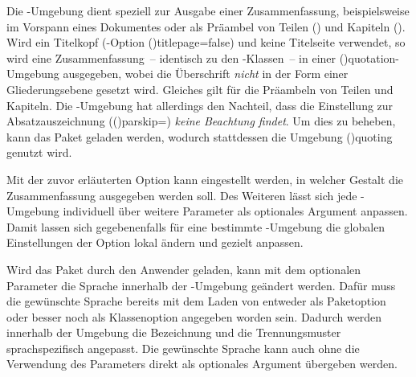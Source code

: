 \begin{DeclareEntity*}{}
\begin{DeclareEntity*}{}
\begin{DeclareEntity*}{}
\begin{Declaration}
\begin{Declaration}
\begin{Declaration}
\begin{Declaration}
\begin{Declaration}
\begin{Declaration}
\begin{Declaration}
Die -Umgebung dient speziell zur Ausgabe einer 
Zusammenfassung, beispielsweise im Vorspann eines Dokumentes oder als Präambel 
von Teilen () und Kapiteln ().
Wird ein Titelkopf 
(\KOMAScript-Option \Option(){titlepage=false})
und keine Titelseite verwendet, so wird eine Zusammenfassung~-- identisch zu den 
\KOMAScript-Klassen~-- in einer 
\Environment(){quotation}-Umgebung 
ausgegeben, wobei die Überschrift \emph{nicht} in der Form einer Gliederungsebene 
gesetzt wird. Gleiches gilt für die Präambeln von Teilen und Kapiteln. Die 
-Umgebung
hat allerdings den Nachteil, dass die Einstellung zur Absatzauszeichnung 
(\Option(){parskip=\PMisc}) \emph{keine Beachtung findet}. 
Um dies zu beheben, kann das Paket  geladen werden, wodurch 
stattdessen die Umgebung \Environment(){quoting} 
genutzt wird.

Mit der zuvor erläuterten Option  kann eingestellt werden, in 
welcher Gestalt die Zusammenfassung ausgegeben werden soll. Des Weiteren lässt 
sich jede -Umgebung individuell über weitere Parameter 
als optionales Argument anpassen. Damit lassen sich gegebenenfalls für eine 
bestimmte -Umgebung die globalen Einstellungen 
der Option  lokal ändern und gezielt anpassen. 

%
Wird das Paket  durch den Anwender geladen, kann mit dem 
optionalen Parameter  die 
Sprache innerhalb der -Umgebung geändert werden. Dafür 
muss die gewünschte Sprache bereits mit dem Laden von  entweder 
als Paketoption oder besser noch als Klassenoption angegeben worden sein. 
Dadurch werden innerhalb der Umgebung die Bezeichnung  und 
die Trennungsmuster sprachspezifisch angepasst. Die gewünschte Sprache kann 
auch ohne die Verwendung des Parameters  
direkt als optionales Argument übergeben werden.


\end{Declaration}
\end{Declaration}
\end{Declaration}
\end{Declaration}
\end{Declaration}
\end{Declaration}
\end{Declaration}
\end{DeclareEntity*}
\end{DeclareEntity*}
\end{DeclareEntity*}
